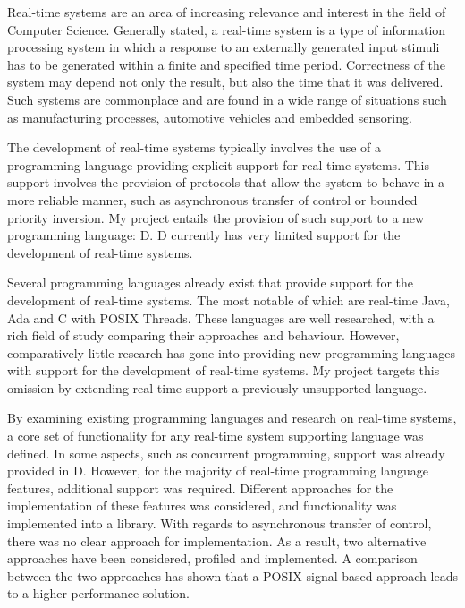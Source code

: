 
Real-time systems are an area of increasing relevance and interest in the field 
of Computer Science. Generally stated, a real-time system is a type of information 
processing system in which a response to an externally generated input stimuli 
has to be generated within a finite and specified time period. Correctness of the 
system may depend not only the result, but also the time that it was delivered. 
Such systems are commonplace and are found in a wide range of 
situations such as manufacturing processes, automotive vehicles and embedded 
sensoring.

The development of real-time systems typically involves the use of a programming 
language providing explicit support for real-time systems. 
This support involves the provision of protocols that allow the system to 
behave in a more reliable manner, such as asynchronous transfer of control or 
bounded priority inversion. 
My project entails the provision of such support to a new programming language: 
D. D currently has very limited support for the development of real-time systems. 

Several programming languages already exist that provide support for the 
development of real-time systems. The most notable of which are 
real-time Java, Ada and C with POSIX Threads. These languages are well researched, 
with a rich field of study comparing their approaches and behaviour. 
However, comparatively little research has gone into providing new programming 
languages with support for the development of real-time systems. My project 
targets this omission by extending real-time support a previously unsupported 
language.

By examining existing programming languages and research on real-time systems, a core set 
of functionality for any real-time system supporting language was defined. 
In some aspects, such as concurrent programming, support was already provided in D. 
However, for the majority of real-time programming language features,
additional support was required. Different approaches for the implementation 
of these features was considered, and functionality was implemented into 
a library. With regards to asynchronous transfer of control, there was no clear 
approach for implementation. As a result, two alternative approaches have 
been considered, profiled and implemented. A comparison between the two approaches 
has shown that a POSIX signal based approach leads to a higher performance 
solution. 

